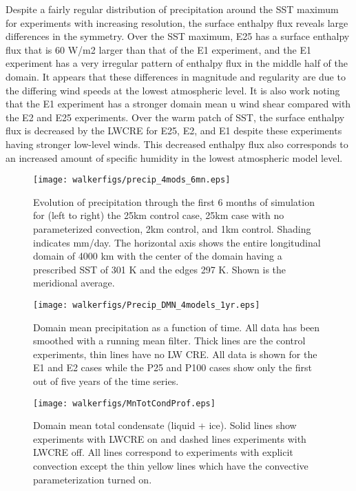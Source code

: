 \documentclass[11pt]{article}   	%
\begin{document}
Despite a fairly regular distribution of precipitation around the SST maximum for experiments with increasing resolution, the 
surface enthalpy flux reveals large differences in the symmetry.  Over the SST maximum, E25 has a surface enthalpy flux that is 
60 W/m2 larger than that of the E1 experiment, and the E1 experiment has a very irregular pattern of enthalpy flux in the middle
half of the domain.  It appears that these differences in magnitude and regularity are due to the differing wind speeds at the 
lowest atmospheric level.  It is also work noting that the E1 experiment has a stronger domain mean u wind shear compared 
with the E2 and E25 experiments.  Over the warm patch of SST, the surface enthalpy flux is decreased by the LWCRE for E25, 
E2, and E1 despite these experiments having stronger low-level winds.  This decreased enthalpy flux also corresponds to 
an increased amount of specific humidity in the lowest atmospheric model level.        

\begin{figure}
  \texttt{[image: walkerfigs/precip\_4mods\_6mn.eps]}
  \caption{Evolution of precipitation through the first 6 months of simulation for (left to right) the 25km control case, 25km case with no 
  parameterized convection, 2km control, and 1km control.  Shading indicates mm/day.  The horizontal axis shows the entire 
  longitudinal domain of 4000 km with the center of the domain having a prescribed SST of 301 K and the edges 297 K.  
  Shown is the meridional average. }
  \label{fig:hov_4mods_6mn}
\end{figure}


\begin{figure}
  \centering
      \texttt{[image: walkerfigs/Precip\_DMN\_4models\_1yr.eps]}
  \caption{Domain mean precipitation as a function of time.  All data has been smoothed with a running mean filter.  
  Thick lines are the control experiments, thin lines have no LW CRE.  All data is shown for the E1 and E2 cases
  while the P25 and P100 cases show only the first out of five years of the time series.}
    \label{fig:precip_dom_mn}
\end{figure}

\begin{figure}
  \centering
      \texttt{[image: walkerfigs/MnTotCondProf.eps]}
          \caption{Domain mean total condensate (liquid + ice).  Solid lines show experiments with LWCRE on
          and dashed lines experiments with LWCRE off.  All lines correspond to experiments with explicit 
          convection except the thin yellow lines which have the convective parameterization turned on.}
  \label{fig:TotCond}
\end{figure}
\end{document}
